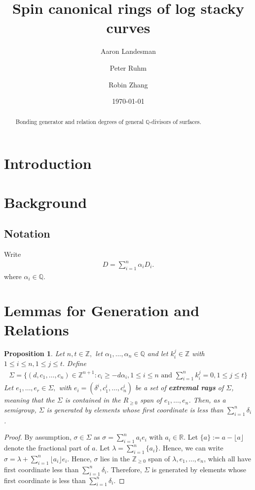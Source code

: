 \documentclass{amsart}
\title{Spin canonical rings of log stacky curves}
\author{Aaron Landesman}
\author{Peter Ruhm}
\author{Robin Zhang}
\date{\today}
\theoremstyle{plain}
\newtheorem{prop}[thm]{Proposition}
\theoremstyle{definition}
\theoremstyle{remark}
\numberwithin{equation}{section}
\newcommand\ssec{\subsection}
\newcommand\br{{\mathbb R}}
\newcommand\bq{{\mathbb Q}}
\newcommand\bz{{\mathbb Z}}
\begin{document}
\begin{abstract}
 	Bonding generator and relation degrees of general $\bq$-divisors
	of surfaces.
\end{abstract}

\maketitle


\section{Introduction}

\section{Background}

\ssec{Notation}

Write
\begin{align*}
	D = \sum_{i=1}^{n}\alpha_i D_i.
\end{align*}
where $\alpha_i \in \bq.$

\section{Lemmas for Generation and Relations}

\begin{prop}
\label{prop:cone-generation}
Let $n,t \in \bz,$ let $\alpha_1, \ldots, \alpha_n \in \bq$ and let $k_i^j \in \bz$ with $1 \leq i \leq n, 1 \leq j \leq t.$ Define
\begin{align*}
	\Sigma = \{(d,c_1, \ldots, c_n) \in \bz^{n+1} : c_i \geq - d \alpha_i,1 \leq i \leq n \text{ and } \sum_{i=1}^{n}k_i^j = 0, 1 \leq j \leq t\}
\end{align*}
Let $e_1, \ldots, e_r \in \Sigma,$ with $e_i = (\delta^i, c_1^i, \ldots, c_n^i)$ be a set of {\bf extremal rays} of $\Sigma$, meaning that the $\Sigma$ is contained in the $R_{\geq 0}$ span of $e_1, \ldots, e_n$.  Then, as a semigroup, $\Sigma$ is generated by elements whose first coordinate is less than $\sum_{i=1}^{n}\delta_i$.
\end{prop}
\begin{proof}
By assumption, $\sigma \in \Sigma$ as $\sigma = \sum_{i=1}^{n}a_i e_i$ with $a_i \in \br$. Let $\{a\} := a - \lfloor a \rfloor$ denote the fractional part of $a$. Let $\lambda = \sum_{i=1}^{n}\{a_i\}$. Hence, we can write $\sigma = \lambda + \sum_{i=1}^{n}\lfloor a_i \rfloor e_i.$ Hence, $\sigma$ lies in the $\bz_{\geq 0}$ span of $\lambda, e_1,\ldots, e_n$, which all have first coordinate less than $\sum_{i=1}^{n}\delta_i$. Therefore, $\Sigma$ is generated by elements whose first coordinate is less than $\sum_{i=1}^{n}\delta_i$.
\end{proof}
\end{document}
